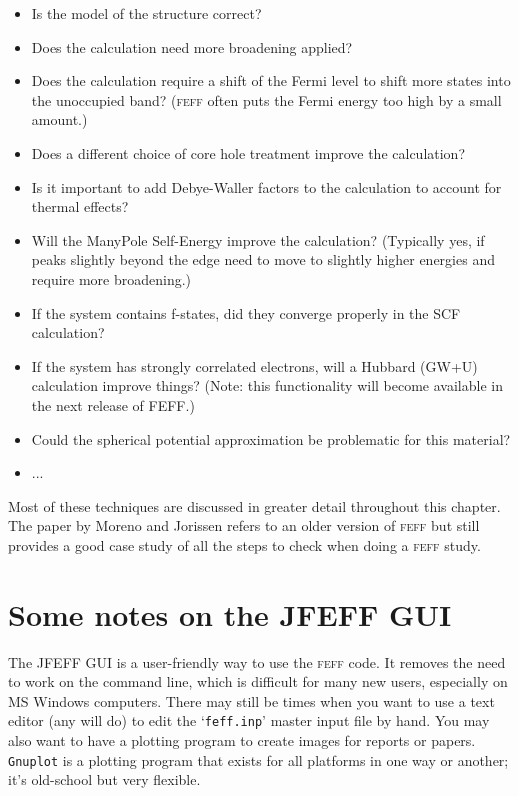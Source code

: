 \documentclass[11pt,oneside]{report} %
\newcommand{\program}[1]{\textsc{#1}}
\newcommand{\feff}{\program{feff}}
\newcommand{\file}[1]{`\texttt{#1}'}
\begin{document}
\begin{itemize} \tightlist
\item Is the model of the structure correct?
\item Does the calculation need more broadening applied?
\item Does the calculation require a shift of the Fermi level to shift more states into the unoccupied band?  ({\feff} often puts the Fermi energy too high by a small amount.)
\item Does a different choice of core hole treatment improve the calculation?
\item Is it important to add Debye-Waller factors to the calculation to account for thermal effects?
\item Will the ManyPole Self-Energy improve the calculation?  (Typically yes, if peaks slightly beyond the edge need to move to slightly higher energies and require more broadening.)
\item If the system contains f-states, did they converge properly in the SCF calculation?
\item If the system has strongly correlated electrons, will a Hubbard (GW+U) calculation improve things?  (Note: this functionality will become available in the next release of FEFF.)
\item Could the spherical potential approximation be problematic for this material?
\item ...
\end{itemize}


Most of these techniques are discussed in greater detail throughout this chapter.  The paper by Moreno and Jorissen refers to an older version of {\feff} but still provides a good case study of all the steps to check when doing a {\feff} study.



\section{Some notes on the JFEFF GUI}
The JFEFF GUI is a user-friendly way to use the {\feff} code.  It removes the need to work on the command line, which is difficult for many new users, especially on MS Windows computers.  There may still be times when you want to use a text editor (any will do) to edit the \file{feff.inp} master input file by hand.  You may also want to have a plotting program to create images for reports or papers.  \texttt{Gnuplot} is a plotting program that exists for all platforms in one way or another; it's old-school but very flexible.
\end{document}
